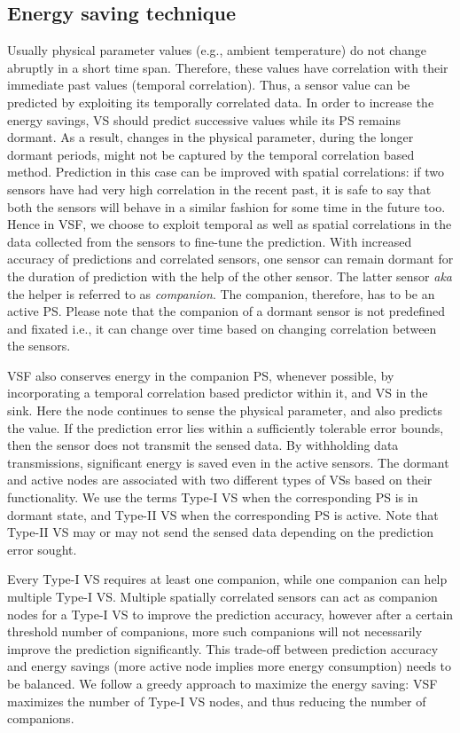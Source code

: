 \documentclass[a4paper,conference]{IEEEtran}
\begin{document}
\subsection{Energy saving technique}
\label{policy}
Usually physical parameter values (e.g., ambient temperature) do not change abruptly in a short time span.  Therefore, these values have correlation with their immediate past values (temporal correlation). Thus, a sensor value can be predicted by exploiting its temporally correlated data. In order to increase the energy savings, VS should predict successive values while its PS remains dormant. As a result, changes in the physical parameter, during the longer dormant periods, might not be captured by the temporal correlation based method. Prediction in this case can be improved with spatial correlations: if two sensors have had very high correlation in the recent past, it is safe to say that both the sensors will behave in a similar fashion for some time in the future too. Hence in VSF, we choose to exploit temporal as well as spatial correlations in the data collected from the sensors to fine-tune the prediction. With increased accuracy of predictions and correlated sensors, one sensor can remain dormant for the duration of prediction with the help of the other sensor. The latter sensor \textit{aka} the helper is referred to as {\it companion}. The companion, therefore, has to be an active PS. Please note that the companion of a dormant sensor is not predefined and fixated i.e., it can change over time based on changing correlation between the sensors.

VSF also conserves energy in the companion PS, whenever possible, by incorporating a temporal correlation based predictor within it, and VS in the sink. Here the node continues to sense the physical parameter, and also predicts the value. If the prediction error lies within a sufficiently tolerable error bounds, then the sensor does not transmit the sensed data. By withholding data transmissions, significant energy is saved even in the active sensors. The dormant and active nodes are associated with two different types of VSs based on their functionality. We use the terms Type-I VS when the corresponding PS is in dormant state,  and Type-II VS when the corresponding PS is active. Note that Type-II VS may or may not send the sensed data depending on the prediction error sought. 

Every Type-I VS requires at least one companion, while one companion can help multiple Type-I VS. Multiple spatially correlated sensors can act as companion nodes for a Type-I VS to improve the prediction accuracy, however after a certain threshold number of companions, more such companions will not necessarily improve the prediction significantly. This trade-off between prediction accuracy and energy savings (more active node implies more energy consumption) needs to be balanced. We follow a greedy approach to maximize the energy saving: VSF maximizes the number of Type-I VS nodes, and thus reducing the number of companions.
\end{document}
